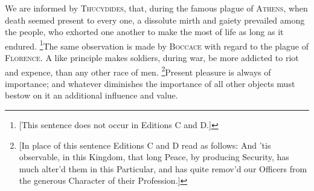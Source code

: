 We are informed by \textsc{Thucydides}, that, during the famous plague
of \textsc{Athens}, when death seemed present to every one, a
dissolute mirth and gaiety prevailed among the people, who exhorted
one another to make the most of life as long as it endured.
\footnote{[This sentence does not occur in Editions C and D.]}The same
observation is made by \textsc{Boccace} with regard to the plague of
\textsc{Florence}. A like principle makes soldiers, during war, be
more addicted to riot and expence, than any other race of men.
\footnote{[In place of this sentence Editions C and D read as follows:
And 'tis observable, in this Kingdom, that long Peace, by producing
Security, has much alter'd them in this Particular, and has quite
remov'd our Officers from the generous Character of their
Profession.]}Present pleasure is always of importance; and whatever
diminishes the importance of all other objects must bestow on it an
additional influence and value.

